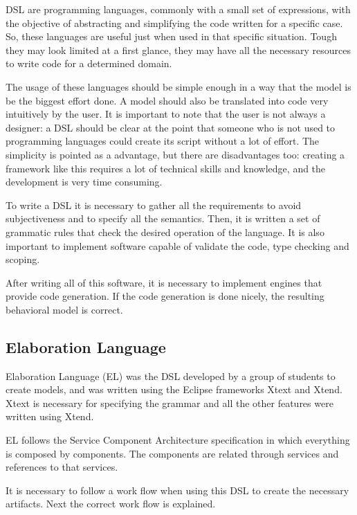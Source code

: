 \documentclass{report}
\begin{document}
		\par DSL are programming languages, commonly with a small set of expressions, with the objective of abstracting and simplifying the code written for a specific case. So, these languages are useful just when used in that specific situation. Tough they may look limited at a first glance, they may have all the necessary resources to write code for a determined domain.
		\par The usage of these languages should be simple enough in a way that the model is be the biggest effort done. A model should also be translated into code very intuitively by the user. It is important to note that the user is not always a designer: a DSL should be clear at the point that someone who is not used to programming languages could create its script without a lot of effort. The simplicity is pointed as a advantage, but there are disadvantages too: creating a framework like this requires a lot of technical skills and knowledge, and the development is very time consuming.
		\par To write a DSL it is necessary to gather all the requirements to avoid subjectiveness and to specify all the semantics. Then, it is written a set of grammatic rules that check the desired operation of the language. It is also important to implement software capable of validate the code, type checking and scoping.
		\par After writing all of this software, it is necessary to implement engines that provide code generation. If the code generation is done nicely, the resulting behavioral model is correct.
		
		
		\subsection{Elaboration Language}
		
		\par Elaboration Language (EL) was the DSL developed by a group of students to create models, and was written using the Eclipse frameworks Xtext and Xtend. Xtext is necessary for specifying the grammar and all the other features were written using Xtend. 
		\par EL follows the Service Component Architecture specification in which everything is composed by components. The components are related through services and references to that services. 
		\par It is necessary to follow a work flow when using this DSL to create the necessary artifacts. Next the correct work flow is explained.
\end{document}
